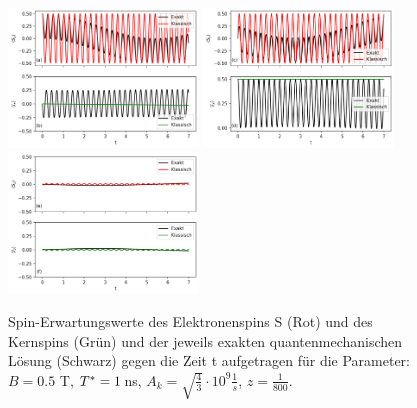 \begin{figure}[h]
    \centering
    \includegraphics[width = 0.45\textwidth]{Abbildungen/Plot_Sx_index.png}
    \includegraphics[width = 0.45\textwidth]{Abbildungen/Plot_Sy_index.png}
    \includegraphics[width = 0.45\textwidth]{Abbildungen/Plot_Sz_index.png}
    \caption{Spin-Erwartungswerte des Elektronenspins S (Rot) und des Kernspins (Grün) und der jeweils exakten quantenmechanischen Lösung
    (Schwarz) gegen die Zeit t aufgetragen für die Parameter: $B = 0.5$ T, $T^*= 1 \thinspace$ns, $A_k = \sqrt{\frac{4}{3}}\cdot 10^9 \frac{1}{s}$,
    $z=\frac{1}{800}$.}
    \label{fig:Plots_2D}
\end{figure}

